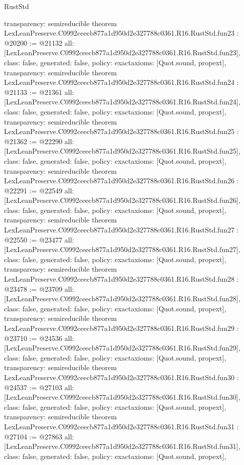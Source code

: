 \begin{lexlean}{RustStd}
\begin{coremodule}
{  transparency: semireducible
}
theorem LexLeanPreserve.C0992ceecb877a1d950d2e327788c0361.R16.RustStd.fun23 : @20200 := @21132 {
  all: [LexLeanPreserve.C0992ceecb877a1d950d2e327788c0361.R16.RustStd.fun23],
  class: false,
  generated: false,
  policy: exact{axioms: [Quot.sound, propext]},
  transparency: semireducible
}
theorem LexLeanPreserve.C0992ceecb877a1d950d2e327788c0361.R16.RustStd.fun24 : @21133 := @21361 {
  all: [LexLeanPreserve.C0992ceecb877a1d950d2e327788c0361.R16.RustStd.fun24],
  class: false,
  generated: false,
  policy: exact{axioms: [Quot.sound, propext]},
  transparency: semireducible
}
theorem LexLeanPreserve.C0992ceecb877a1d950d2e327788c0361.R16.RustStd.fun25 : @21362 := @22290 {
  all: [LexLeanPreserve.C0992ceecb877a1d950d2e327788c0361.R16.RustStd.fun25],
  class: false,
  generated: false,
  policy: exact{axioms: [Quot.sound, propext]},
  transparency: semireducible
}
theorem LexLeanPreserve.C0992ceecb877a1d950d2e327788c0361.R16.RustStd.fun26 : @22291 := @22549 {
  all: [LexLeanPreserve.C0992ceecb877a1d950d2e327788c0361.R16.RustStd.fun26],
  class: false,
  generated: false,
  policy: exact{axioms: [Quot.sound, propext]},
  transparency: semireducible
}
theorem LexLeanPreserve.C0992ceecb877a1d950d2e327788c0361.R16.RustStd.fun27 : @22550 := @23477 {
  all: [LexLeanPreserve.C0992ceecb877a1d950d2e327788c0361.R16.RustStd.fun27],
  class: false,
  generated: false,
  policy: exact{axioms: [Quot.sound, propext]},
  transparency: semireducible
}
theorem LexLeanPreserve.C0992ceecb877a1d950d2e327788c0361.R16.RustStd.fun28 : @23478 := @23709 {
  all: [LexLeanPreserve.C0992ceecb877a1d950d2e327788c0361.R16.RustStd.fun28],
  class: false,
  generated: false,
  policy: exact{axioms: [Quot.sound, propext]},
  transparency: semireducible
}
theorem LexLeanPreserve.C0992ceecb877a1d950d2e327788c0361.R16.RustStd.fun29 : @23710 := @24536 {
  all: [LexLeanPreserve.C0992ceecb877a1d950d2e327788c0361.R16.RustStd.fun29],
  class: false,
  generated: false,
  policy: exact{axioms: [Quot.sound, propext]},
  transparency: semireducible
}
theorem LexLeanPreserve.C0992ceecb877a1d950d2e327788c0361.R16.RustStd.fun30 : @24537 := @27103 {
  all: [LexLeanPreserve.C0992ceecb877a1d950d2e327788c0361.R16.RustStd.fun30],
  class: false,
  generated: false,
  policy: exact{axioms: [Quot.sound, propext]},
  transparency: semireducible
}
theorem LexLeanPreserve.C0992ceecb877a1d950d2e327788c0361.R16.RustStd.fun31 : @27104 := @27863 {
  all: [LexLeanPreserve.C0992ceecb877a1d950d2e327788c0361.R16.RustStd.fun31],
  class: false,
  generated: false,
  policy: exact{axioms: [Quot.sound, propext]},
}
\end{coremodule}
\end{lexlean}
